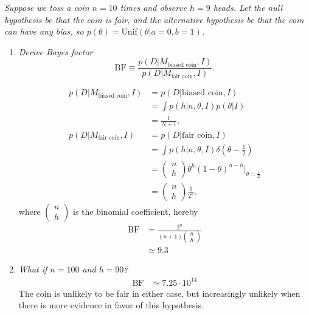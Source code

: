 \begin{example}
	\emph{Suppose we toss a coin $n=10$ times and observe $h=9$ heads. Let the null hypothesis be that the coin is fair, and the alternative hypothesis be that the coin can have any bias, so $p(\theta) = \text{Unif}(\theta|a=0,b=1)$.}
	
	\begin{enumerate}
		\item \emph{Derive Bayes factor}
		\begin{equation}
			\text{BF}\equiv \frac{p(D|M_\text{biased coin},I)}{p(D|M_\text{fair coin},I)}.
		\end{equation}
		
		\begin{equation}
			\begin{split}
				p(D|M_\text{biased coin},I) &= p(D|\text{biased coin},I)\\
				&=\int p(h|n,\theta,I)p(\theta|I)\\
				&=\frac{1}{N+1},\\
				p(D|M_\text{fair coin},I) &= p(D|\text{fair coin},I)\\
				&=\int p(h|n,\theta,I)\delta(\theta-\frac{1}{2})\\
				&=\begin{pmatrix}
					n\\
					h
				\end{pmatrix}\theta^h(1-\theta)^{n-h}|_{\theta=\frac{1}{2}}\\
				& = \begin{pmatrix}
					n\\
					h
				\end{pmatrix}\frac{1}{2^n},
			\end{split}
		\end{equation}
		where $\begin{pmatrix}
			n\\
			h
		\end{pmatrix}$ is the binomial coefficient,	hereby
		\begin{equation}
			\begin{split}
				\text{BF} &= \frac{2^n}{(n+1)\begin{pmatrix}
						n\\
						h
				\end{pmatrix}}\\
				&\simeq 9.3
			\end{split}
		\end{equation}
		
		\item \emph{What if $n=100$ and $h=90$?}
		\begin{equation}
			\begin{split}
				\text{BF}	&\simeq 7.25\cdot 10^{14}
			\end{split}
		\end{equation}
		The coin is unlikely to be fair in either case, but increasingly unlikely when there is more evidence in favor of this hypothesis.
	\end{enumerate}
\end{example}



